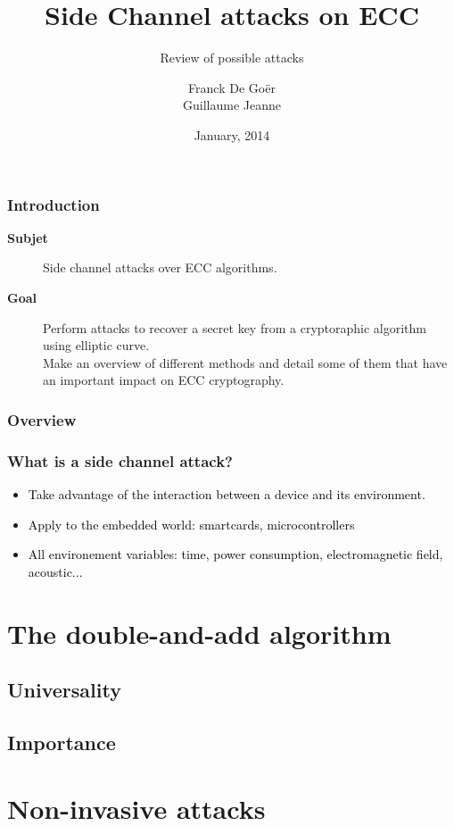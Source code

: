 \documentclass{beamer}
\title[ECC Side channel attacks]{Side Channel attacks on ECC}
\subtitle{Review of possible attacks}
\author{Franck De Goër\\Guillaume Jeanne}
\institute{SCCI - Ensimag}
\date{January, 2014}
\begin{document}
\begin{frame}
    \titlepage
\end{frame}

\begin{frame}[t]
    \frametitle{Introduction}
    \vspace{1cm}
    \begin{description}
        \item[{\bf Subjet}] Side channel attacks over ECC algorithms.
        \item[{\bf Goal}] Perform attacks to recover a secret key from a cryptoraphic algorithm using elliptic curve. \\
	Make an overview of different methods and detail some of them that have an important impact on ECC cryptography.
	
    \end{description}
\end{frame}

\begin{frame}
    \frametitle{Overview}
    \tableofcontents
\end{frame}

\begin{frame}
    \frametitle{What is a side channel attack?}
    \begin{itemize}
        \item \textcolor{black} {Take advantage of the interaction between a device and its environment.}
        \item \textcolor{black} {Apply to the embedded world: smartcards, microcontrollers}
	\item \textcolor{black} {All environement variables: time, power consumption, electromagnetic field, acoustic...}
    \end{itemize}

\end{frame}


\section{The double-and-add algorithm}
    \subsection{Universality}
    \subsection{Importance}

\section{Non-invasive attacks}
\end{document}
